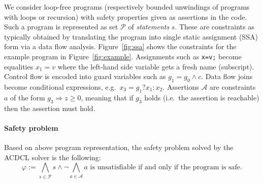 We consider loop-free programs (respectively bounded unwindings of
programs with loops or recursion) with safety properties given as
assertions in the code.
%
Such a program is represented as set $\mathcal{P}$ of
\emph{statements} $s$.  These are constraints as typically obtained by
translating the program into single static assignment (SSA) form via a
data flow analysis.
%
Figure~\ref{fig:ssa} shows the constraints for the example program in
Figure~\ref{fig:example}.
%
Assignments such as \texttt{x=v;} become equalities $x_1=v$ where the
left-hand side variable gets a fresh name (subscript).
%
Control flow is encoded into guard variables such as $g_1=g_0\wedge c$.
%
Data flow joins become conditional expressions, e.g.\ $x_3=g_1?x_1:x_2$.
%
Assertions $\mathcal{A}$ are constraints $a$ of the form $g_3
\Rightarrow z\geq 0$, meaning that if $g_3$ holds (i.e.\ the assertion
is reachable) then the assertion must hold.


% 

\paragraph{Safety problem}  
%
Based on above program representation, the safety problem solved by the ACDCL solver is the following:
%
\begin{equation}\label{eq:safety}
\varphi:= \bigwedge_{s\in\mathcal{P}} s \wedge \neg \bigwedge_{a\in\mathcal{A}} a
\text{ is unsatisfiable if and only if the program is safe.}
\end{equation}


